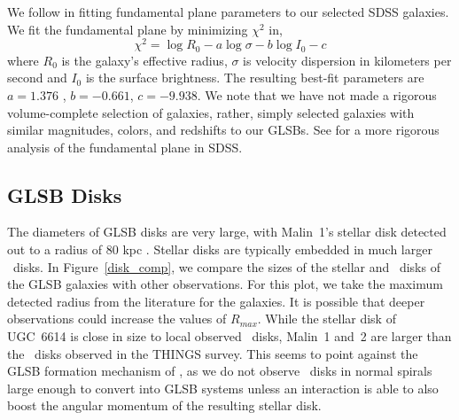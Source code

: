 \documentclass{emulateapj}
\newcommand\HI{\ion{H}{1}}
\begin{document}
We follow \citet{Bernardi03,Bernardi03b} in fitting fundamental plane parameters to our selected SDSS galaxies.  We fit the fundamental plane by minimizing $\chi^2$ in, 
\begin{equation}
\chi^2 = \log R_0 - a \log \sigma - b \log I_0 - c
\end{equation}
where $R_0$ is the galaxy's effective radius, $\sigma$ is velocity dispersion in kilometers per second and $I_0$ is the surface brightness.  The resulting best-fit parameters are  $a =1.376$ , $b = -0.661$, $c = -9.938$.  We note that we have not made a rigorous volume-complete selection of galaxies, rather, simply selected galaxies with similar magnitudes, colors, and redshifts to our GLSBs.   See \citet{Saulder13} for a more rigorous analysis of the fundamental plane in SDSS. 

\subsection{GLSB Disks}\label{sec:disks}



The diameters of GLSB disks are very large, with Malin~1's stellar disk detected out to a radius of 80 kpc \citep{Galaz15}.  Stellar disks are typically embedded in much larger \HI\ disks.  In Figure~\ref{disk_comp}, we compare the sizes of the stellar and \HI\ disks of the GLSB galaxies with other observations.  For this plot, we take the maximum detected radius from the literature for the galaxies.  It is possible that deeper observations could increase the values of $R_{max}$.  While the stellar disk of UGC~6614 is close in size to local observed \HI\ disks, Malin~1 and~2 are larger than the \HI\ disks observed in the THINGS survey.  This seems to point against the GLSB formation mechanism of \citet{Mapelli08}, as we do not observe \HI\ disks in normal spirals large enough to convert into GLSB systems unless an interaction is able to also boost the angular momentum of the resulting stellar disk.

\begin{figure*}
\caption{ Comparison of the GLSB disks with other galaxy disks from the literature.  THINGS data taken from \citet{DeBlok2008}, GLSB \HI\ data from Malin 1 from \citet{Pickering97} and GLSB stellar radii from \citet{Galaz15}, \citet{Kasparova14}, and this paper.  Here, $R_{max}$ is the maximum radius with an \HI\ or optical detection.  For the GLSB galaxies, the circular points show the maximum \HI\ detection radius and stars-shaped points show the maximum detected stellar light radius.  All points are maximum detection radii, and thus should be considered lower limits.   \label{disk_comp}}
\end{figure*}
\end{document}
